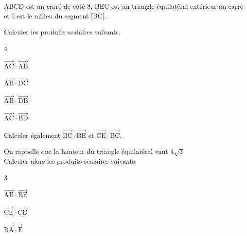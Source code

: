 \documentclass[12pt,a4paper]{article}  %
\begin{document}
ABCD est un carré de côté $8$, BEC est un triangle équilatéral extérieur au carré et I est le milieu du segment [BC].
\begin{enumMet}
    \item Calculer les produits scalaires suivants.
    \begin{multicols}{4}
        \begin{enumMet}
            \item $\overrightarrow{\mathrm{AC}} \cdot \overrightarrow{\mathrm{AB}}$
            \item $\overrightarrow{\mathrm{AB}} \cdot \overrightarrow{\mathrm{DC}}$
            \item $\overrightarrow{\mathrm{AB}} \cdot \overrightarrow{\mathrm{DB}}$
            \item $\overrightarrow{\mathrm{AC}} \cdot \overrightarrow{\mathrm{BD}}$
        \end{enumMet}
    \end{multicols}
    \item Calculer également $\overrightarrow{\mathrm{BC}} \cdot \overrightarrow{\mathrm{BE}}$ et $\overrightarrow{\mathrm{CE}} \cdot \overrightarrow{\mathrm{BC}}$.
    \item On rappelle que la hauteur du triangle équilatéral vaut $4 \sqrt{3}$\\
    Calculer alors les produits scalaires suivants.
    \begin{multicols}{3}
        \begin{enumMet}
            \item $\overrightarrow{\mathrm{AB}} \cdot \overrightarrow{\mathrm{BE}}$
            \item $\overrightarrow{\mathrm{CE}} \cdot \overrightarrow{\mathrm{CD}}$
            \item $\overrightarrow{\mathrm{BA}} \cdot \overrightarrow{\mathrm{E}}$
        \end{enumMet}
    \end{multicols}
\end{enumMet}

\end{document}
